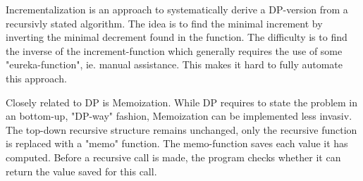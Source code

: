 Incrementalization is an approach to systematically derive a DP-version from a recursivly stated algorithm. The idea is to find the minimal increment by inverting the minimal decrement found in the function. The difficulty is to find the inverse of the increment-function which generally requires the use of some "eureka-function", ie. manual assistance. This makes it hard to fully automate this approach.

Closely related to DP is Memoization. While DP requires to state the problem in an bottom-up, "DP-way" fashion, Memoization can be implemented less invasiv. The top-down recursive structure remains unchanged, only the recursive function is replaced with a "memo" function. The memo-function saves each value it has computed. Before a recursive call is made, the program checks whether it can return the value saved for this call.
